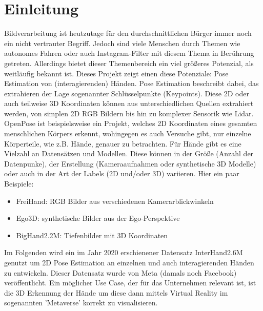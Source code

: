 \chapter{Einleitung}\label{einleitung}

Bildverarbeitung ist heutzutage für den durchschnittlichen Bürger immer noch ein nicht vertrauter Begriff. 
Jedoch sind viele Menschen durch Themen wie autonomes Fahren oder auch Instagram-Filter mit diesem Thema in Berührung getreten.
Allerdings bietet dieser Themenbereich ein viel größeres Potenzial, als weitläufig bekannt ist.
Dieses Projekt zeigt einen diese Potenziale: Pose Estimation von (interagierenden) Händen. \newline
Pose Estimation beschreibt dabei, das extrahieren der Lage sogenannter Schlüsselpunkte (Keypoints).
Diese 2D oder auch teilweise 3D Koordinaten können aus unterschiedlichen Quellen extrahiert werden, von simplen 2D RGB Bildern bis hin zu komplexer Sensorik wie Lidar. \newline
OpenPose \cite{openpose} ist beispielsweise ein Projekt, welches 2D Koordinaten eines gesamten menschlichen Körpers erkennt, wohingegen es auch Versuche gibt, nur einzelne Körperteile, wie z.B. Hände, genauer zu betrachten. 
Für Hände gibt es eine Vielzahl an Datensätzen und Modellen.
Diese können in der Größe (Anzahl der Datenpunke), der Erstellung (Kameraaufnahmen oder synthetische 3D Modelle) oder auch in der Art der Labels (2D und/oder 3D) variieren. 
Hier ein paar Beispiele:
\begin{itemize}
\item FreiHand: RGB Bilder aus verschiedenen Kamerarblickwinkeln \cite{freihand}
\item Ego3D: synthetische Bilder aus der Ego-Perspektive \cite{ego3d}
\item BigHand2.2M: Tiefenbilder mit 3D Koordinaten \cite{bighand}
\end{itemize}

Im Folgenden wird ein im Jahr 2020 erschienener Datensatz InterHand2.6M \cite{InterHand} genutzt um 2D Pose Estimation an einzelnen und auch interagierenden Händen zu entwickeln.
Dieser Datensatz wurde von Meta (damals noch Facebook) veröffentlicht. Ein möglicher Use Case, der für das Unternehmen relevant ist, ist die 3D Erkennung der Hände um diese dann mittels Virtual Reality im sogenannten 'Metaverse' korrekt zu visualisieren.
